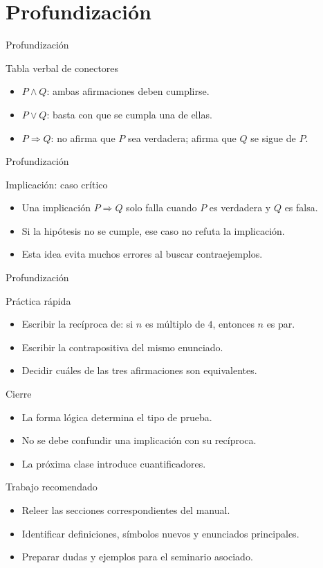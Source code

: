\documentclass[aspectratio=169,11pt]{beamer}
\begin{document}
\section{Profundización}

\begin{frame}{Profundización}
\begin{block}{Tabla verbal de conectores}
\begin{itemize}
  \item \(P\wedge Q\): ambas afirmaciones deben cumplirse.
  \item \(P\vee Q\): basta con que se cumpla una de ellas.
  \item \(P\Rightarrow Q\): no afirma que \(P\) sea verdadera; afirma que \(Q\) se sigue de \(P\).
\end{itemize}
\end{block}
\end{frame}

\begin{frame}{Profundización}
\begin{block}{Implicación: caso crítico}
\begin{itemize}
  \item Una implicación \(P\Rightarrow Q\) solo falla cuando \(P\) es verdadera y \(Q\) es falsa.
  \item Si la hipótesis no se cumple, ese caso no refuta la implicación.
  \item Esta idea evita muchos errores al buscar contraejemplos.
\end{itemize}
\end{block}
\end{frame}

\begin{frame}{Profundización}
\begin{block}{Práctica rápida}
\begin{itemize}
  \item Escribir la recíproca de: si \(n\) es múltiplo de \(4\), entonces \(n\) es par.
  \item Escribir la contrapositiva del mismo enunciado.
  \item Decidir cuáles de las tres afirmaciones son equivalentes.
\end{itemize}
\end{block}
\end{frame}

\begin{frame}{Cierre}
\begin{itemize}
  \item La forma lógica determina el tipo de prueba.
  \item No se debe confundir una implicación con su recíproca.
  \item La próxima clase introduce cuantificadores.
\end{itemize}
\end{frame}

\begin{frame}{Trabajo recomendado}
\begin{itemize}
  \item Releer las secciones correspondientes del manual.
  \item Identificar definiciones, símbolos nuevos y enunciados principales.
  \item Preparar dudas y ejemplos para el seminario asociado.
\end{itemize}
\end{frame}
\end{document}
